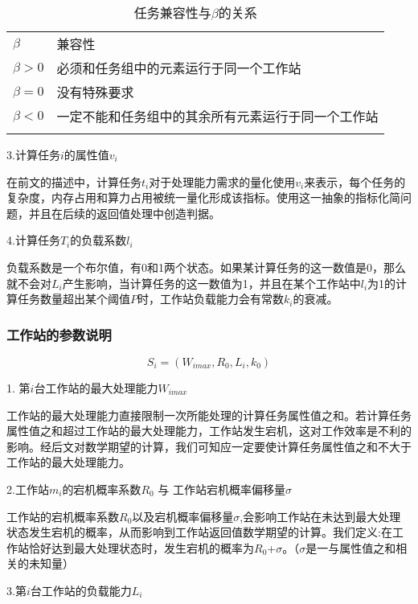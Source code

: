 \documentclass{MathorCupmodeling}
\begin{document}
\begin{table}[htbp]
  \centering
    \begin{tabular}{ll}
\Xhline{0.08em}
    $\beta$       &  兼容性  \\
\Xhline{0.08em}
      $\beta>0$     &  必须和任务组中的元素运行于同一个工作站 \\
      $\beta=0$     & 没有特殊要求  \\
      $\beta<0$      & 一定不能和任务组中的其余所有元素运行于同一个工作站 \\
\Xhline{0.08em}
    \end{tabular}%
  \caption{任务兼容性与$\beta $的关系}
  \label{tab:addlabel}%
\end{table}%


3.计算任务$i$的属性值$v_i$

在前文的描述中，计算任务$t_i$对于处理能力需求的量化使用$v_i$来表示，每个任务的复杂度，内存占用和算力占用被统一量化形成该指标。使用这一抽象的指标化简问题，并且在后续的返回值处理中创造判据。

4.计算任务$T_i$的负载系数$l_i$

负载系数是一个布尔值，有0和1两个状态。如果某计算任务的这一数值是0，那么就不会对$L_i$产生影响，当计算任务的这一数值为1，并且在某个工作站中$l_i$为1的计算任务数量超出某个阈值$P$时，工作站负载能力会有常数$k_i$的衰减。

\subsubsection{工作站的参数说明}
\begin{equation}
S_i=(W_{imax},R_0,L_i,k_0)
\end{equation}

1. 第$i$台工作站的最大处理能力$W_{imax}$

工作站的最大处理能力直接限制一次所能处理的计算任务属性值之和。若计算任务属性值之和超过工作站的最大处理能力，工作站发生宕机，这对工作效率是不利的影响。经后文对数学期望的计算，我们可知应一定要使计算任务属性值之和不大于工作站的最大处理能力。

2.工作站$m_i$的宕机概率系数$R_0$ 与 工作站宕机概率偏移量$\sigma$ 
 
工作站的宕机概率系数$R_0$以及宕机概率偏移量$\sigma$,会影响工作站在未达到最大处理状态发生宕机的概率，从而影响到工作站返回值数学期望的计算。我们定义:在工作站恰好达到最大处理状态时，发生宕机的概率为$R_0$+$\sigma$。（$\sigma$是一与属性值之和相关的未知量）

3.第$i$台工作站的负载能力$L_i$ 
 
\end{document}
